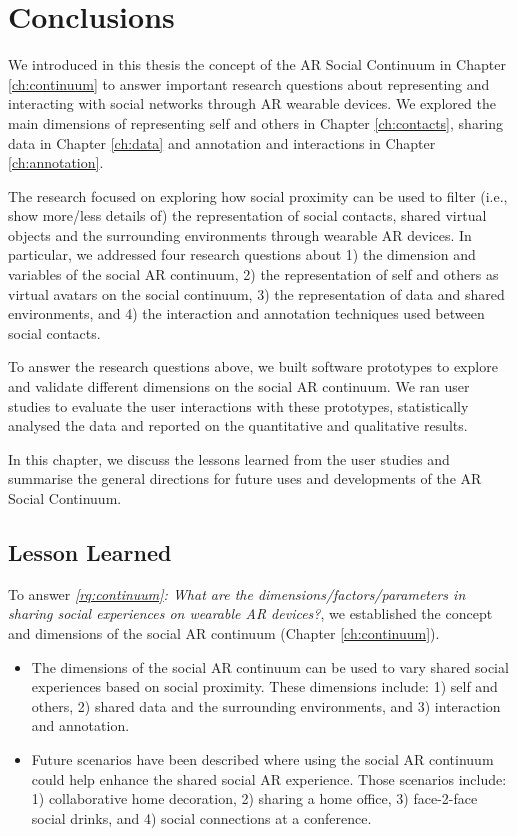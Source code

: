 \chapter{Conclusions}
\label{ch:conclusions}

We introduced in this thesis the concept of the AR Social Continuum in Chapter \ref{ch:continuum} to answer important research questions about representing and interacting with social networks through AR wearable devices. We explored the main dimensions of representing self and others in Chapter \ref{ch:contacts}, sharing data in Chapter \ref{ch:data} and annotation and interactions in Chapter \ref{ch:annotation}. 

The research focused on exploring how social proximity can be used to filter (i.e., show more/less details of) the representation of social contacts, shared virtual objects and the surrounding environments through wearable AR devices. In particular, we addressed four research questions about 1) the dimension and variables of the social AR continuum, 2) the representation of self and others as virtual avatars on the social continuum, 3) the representation of data and shared environments, and 4) the interaction and annotation techniques used between social contacts.   

To answer the research questions above, we built software prototypes to explore and validate different dimensions on the social AR continuum. We ran user studies to evaluate the user interactions with these prototypes, statistically analysed the data and reported on the quantitative and qualitative results. 

In this chapter, we discuss the lessons learned from the user studies and summarise the general directions for future uses and developments of the AR Social Continuum. 

\pagebreak

\section{Lesson Learned}
To answer \textit{\ref{rq:continuum}: What are the dimensions/factors/parameters in sharing social experiences on wearable AR devices?}, we established the concept and dimensions of the social AR continuum (Chapter \ref{ch:continuum}).

\begin{itemize}
    \item{The dimensions of the social AR continuum can be used to vary shared social experiences based on social proximity. These dimensions include: 1) self and others, 2) shared data and the surrounding environments, and 3) interaction and annotation.}
    \item{Future scenarios have been described where using the social AR continuum could help enhance the shared social AR experience. Those scenarios include: 1) collaborative home decoration, 2) sharing a home office, 3) face-2-face social drinks, and 4) social connections at a conference.}
\end{itemize}

